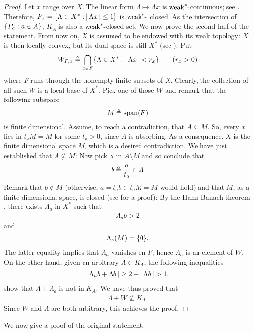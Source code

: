 \begin{proof}%
Let $x$ range over $X$. The linear form %
%
  $\Lambda \mapsto \Lambda x$ %
%
is $\text{weak}^\ast\text{-}$continuous; see . %
Therefore, %
%
  $P_x= \{\Lambda \in X^\ast: \left\lvert\, \Lambda x \,\right\rvert \leq 1\}$ %
%
is $\text{weak}^\ast\text{-}$ closed: %
As the intersection of $\{P_a: a\in A\}$, %
$K_A$ is also a $\text{weak}^\ast\text{-}$closed set. %
We now prove the second half of the statement. %
%
\newline\newline\noindent
%
From now on, $X$ is assumed to be endowed with its weak topology: %
$X$ is then locally convex, but its dual space is still %
%
  $X^\ast$ (see ). %
%
Put %
%
  \begin{align}
    W_{F, x} \triangleq \bigcap_{x\in F} \{\Lambda \in X^\ast: \left\lvert\, \Lambda x \,\right\rvert < r_x\} \quad\quad (r_x > 0)
  \end{align}
%
where $F$ runs through the nonempty finite subsets of $X$. %
%
Clearly, the collection of all such $W$ is a local base of $X^\ast$. %
Pick one of those $W$ and remark that the following subspace %
%
  \begin{align}
    M \triangleq \text{span}(F)
  \end{align}
%
is finite dimensional. %
Assume, to reach a contradiction, that $A\subseteq M$. %
So, every $x$ lies in $t_xM=M$ for some $t_x>0$, since $A$ is absorbing. %
As a consequence, $X$ is the finite dimensional space $M$, %
which is a desired contradiction.
%
We have just established that $A\not\subseteq M$: %
Now pick $\mathit{a}$ in $A\setminus M$ and so conclude that %
%
  \begin{align}
    b\triangleq \frac{a}{t_a}\in A
  \end{align}
%
Remark that $b\notin M$ (otherwise, $a = t_a b \in t_a M=M$ would hold) %
and that $M$, as a finite dimensional space, is closed %
(see  for a proof): %
By the Hahn-Banach theorem , %
there exists $\Lambda_a$ in $X^\ast$ such that 
%
  \begin{align}\label{3.11. Polar_4.}
    \Lambda_a b > 2
  \end{align}
%
and
%
  \begin{align}\label{3.11. Polar_4bis.}
    \Lambda_a (M) = \{0\}.
  \end{align}
%
The latter equality implies that $\Lambda_a$ vanishes on $F$; %
hence $\Lambda_a$ is an element of $W$. %
On the other hand, given an arbitrary $\Lambda \in K_A$, %
the following inequalities  %
%
  \begin{align}
    \left\lvert\, \Lambda_a b + \Lambda b \,\right\rvert 
      \geq 
    2 - \left\lvert\, \Lambda b \,\right\rvert 
      >
    1.
  \end{align}
%
show that $\Lambda + \Lambda_a$ is not in $K_A$. %
%
We have thus proved that
%
  \begin{align}
  \Lambda + W\not\subseteq K_A.
  \end{align}
%
Since $W$ and $\Lambda$ are both arbitrary, this achieves the proof. %
\end{proof}
%
\noindent
We now give a proof of the original statement. %
%
